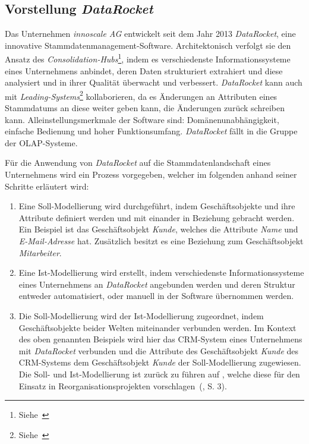 \documentclass[
  language=german, %
  type=bachelor%
]{isthesis}
\begin{document}
\begin{content}
  \section{Vorstellung \textit{DataRocket}}\label{sec:Vorstellung-DataRocket}

	Das Unternehmen \textit{innoscale AG} entwickelt seit dem Jahr 2013
	\textit{DataRocket}, eine innovative Stammdatenmanagement-Software.
	Architektonisch verfolgt sie den Ansatz des
	\textit{Consolidation-Hubs}\footnote{Siehe~\cite{baghi2014toward}}, indem es
	verschiedenste Informationssysteme eines Unternehmens anbindet, deren Daten
	strukturiert extrahiert und diese analysiert und in ihrer Qualität überwacht
	und verbessert. \textit{DataRocket} kann auch mit
	\textit{Leading-Systems}\footnote{Siehe~\cite{baghi2014toward}}
	kollaborieren, da es Änderungen an Attributen eines Stammdatums an diese
	weiter geben kann, \bzw{} die Änderungen zurück schreiben kann.
	Alleinstellungsmerkmale der Software sind: Domänenunabhängigkeit, einfache
	Bedienung und hoher Funktionsumfang. \textit{DataRocket} fällt in die Gruppe der \acrshort{OLAP}-Systeme.

	Für die Anwendung von \textit{DataRocket} auf die Stammdatenlandschaft eines
	Unternehmens wird ein Prozess vorgegeben, welcher im folgenden anhand seiner
	Schritte erläutert wird:

	\begin{enumerate}
    \item Eine Soll-Modellierung wird durchgeführt, indem Geschäftsobjekte und
      ihre Attribute definiert werden und mit einander in Beziehung gebracht
      werden. Ein Beispiel ist das Geschäftsobjekt \textit{Kunde}, welches die
      Attribute \textit{Name} und \textit{E-Mail-Adresse} hat. Zusätzlich
      besitzt es eine Beziehung zum Geschäftsobjekt \textit{Mitarbeiter}. 

    \item Eine Ist-Modellierung wird erstellt, indem verschiedenste
      Informationssysteme eines Unternehmens an \textit{DataRocket} angebunden
      werden und deren Struktur entweder automatisiert, oder manuell in der
      Software übernommen werden. 

    \item Die Soll-Modellierung wird der Ist-Modellierung zugeordnet, indem
      Geschäftsobjekte beider Welten miteinander verbunden werden. Im Kontext
      des oben genannten Beispiels wird hier das \acrshort{CRM}-System eines
      Unternehmens mit \textit{DataRocket} verbunden und die Attribute des
      Geschäftsobjekt \textit{Kunde} des \acrshort{CRM}-Systems dem
      Geschäftsobjekt \textit{Kunde} der Soll-Modellierung zugewiesen. Die
      Soll- und Ist-Modellierung ist zurück zu führen auf
      \textsc{\citeauthor{becker2006konzeptionelle}}, welche diese \zB{} für
      den Einsatz in \glqq{}Reorganisationsprojekten\grqq{}
      vorschlagen~(\citeyear{becker2006konzeptionelle}, S. 3).


\end{enumerate}
\end{content}
\end{document}
